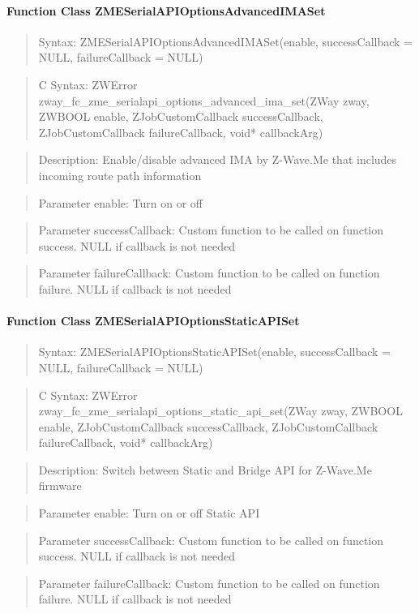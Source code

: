 \paragraph{Function Class ZMESerialAPIOptionsAdvancedIMASet}
\begin{quote}Syntax: ZMESerialAPIOptionsAdvancedIMASet(enable, successCallback = NULL, failureCallback = NULL)\end{quote}
\begin{quote}C Syntax: ZWError zway\_fc\_zme\_serialapi\_options\_advanced\_ima\_set(ZWay zway, ZWBOOL enable, ZJobCustomCallback successCallback, ZJobCustomCallback failureCallback, void* callbackArg)\end{quote}
\begin{quote}Description: Enable/disable advanced IMA by Z-Wave.Me that includes incoming route path information\end{quote}
\begin{quote}Parameter enable: Turn on or off\end{quote}
\begin{quote}Parameter successCallback: Custom function to be called on function success. NULL if callback is not needed\end{quote}
\begin{quote}Parameter failureCallback: Custom function to be called on function failure. NULL if callback is not needed\end{quote}


\paragraph{Function Class ZMESerialAPIOptionsStaticAPISet}
\begin{quote}Syntax: ZMESerialAPIOptionsStaticAPISet(enable, successCallback = NULL, failureCallback = NULL)\end{quote}
\begin{quote}C Syntax: ZWError zway\_fc\_zme\_serialapi\_options\_static\_api\_set(ZWay zway, ZWBOOL enable, ZJobCustomCallback successCallback, ZJobCustomCallback failureCallback, void* callbackArg)\end{quote}
\begin{quote}Description: Switch between Static and Bridge API for Z-Wave.Me firmware\end{quote}
\begin{quote}Parameter enable: Turn on or off Static API\end{quote}
\begin{quote}Parameter successCallback: Custom function to be called on function success. NULL if callback is not needed\end{quote}
\begin{quote}Parameter failureCallback: Custom function to be called on function failure. NULL if callback is not needed\end{quote}


